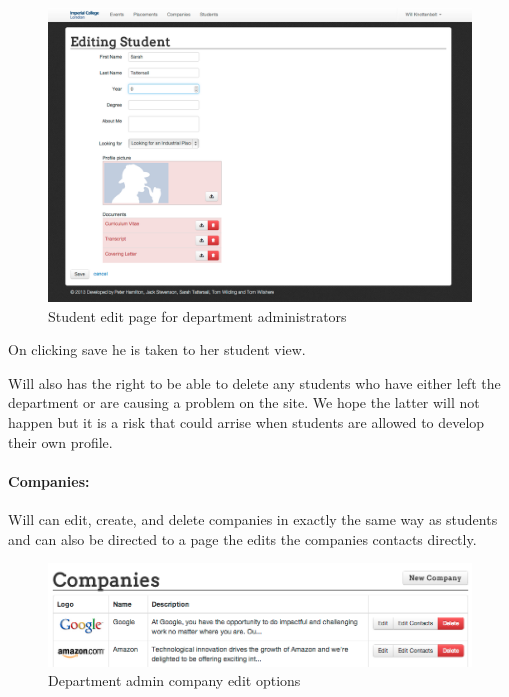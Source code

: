    \begin{figure}[H]\centering
    \includegraphics[scale=0.3]{images/user_experiences/admin/admin_student_edit}
    \caption{Student edit page for department administrators}
    \end{figure}

    On clicking save he is taken to her student view. 

    Will also has the right to be able to delete any students who have either left the department or are causing a problem on the site. We hope the latter will not happen but it is a risk that could arrise when students are allowed to develop their own profile.

  \paragraph{Companies:}
    Will can edit, create, and delete companies in exactly the same way as students and can also be directed to a page the edits the companies contacts directly. 

    \begin{figure}[H]\centering
    \includegraphics[scale=0.5]{images/user_experiences/admin/admin_company_edit_options}
    \caption{Department admin company edit options}
    \end{figure}


